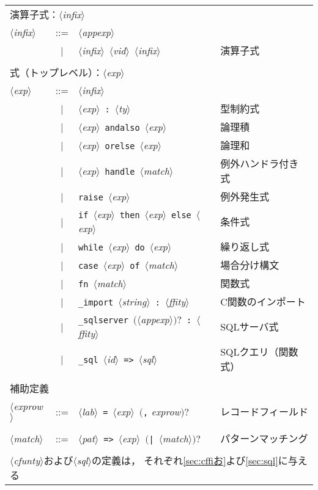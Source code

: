 \documentclass{jbook}
\newcommand{\vbar}{\mbox{\ $|$\ }}
\newcommand{\nonterm}[1]{\mbox{$\langle$}{\it #1}\mbox{$\rangle$}}
\newcommand{\term}[1]{\mbox{{\tt #1}}}
\newcommand{\optional}[1]{\mbox{$($}{\protect #1}\mbox{$)?$}}
\begin{document}
\begin{center}
\begin{tabular}{lcll}
\\
\multicolumn{3}{l}{演算子式：\nonterm{infix}}
\\
\nonterm{infix}&::=& 
       \nonterm{appexp}& \\
&\vbar&\nonterm{infix}\ \nonterm{vid}\ \nonterm{infix} & 演算子式\\
\\
\multicolumn{3}{l}{式（トップレベル）：\nonterm{exp}}
\\
\nonterm{exp} &::=& 
        \nonterm{infix} \\
&\vbar &\nonterm{exp}\ \term{:}\ \nonterm{ty} & 型制約式\\
&\vbar &\nonterm{exp}\ \term{andalso}\ \nonterm{exp} & 論理積\\
&\vbar &\nonterm{exp}\ \term{orelse}\ \nonterm{exp} & 論理和\\
&\vbar &\nonterm{exp}\ \term{handle}\ \nonterm{match} & 例外ハンドラ付き式\\
&\vbar &\term{raise}\ \nonterm{exp} & 例外発生式\\
&\vbar &\term{if}\ \nonterm{exp}\ \term{then}\ \nonterm{exp}\ \term{else}\ \nonterm{exp}& 条件式\\
&\vbar &\term{while}\ \nonterm{exp}\ \term{do}\ \nonterm{exp}& 繰り返し式\\
&\vbar &\term{case}\ \nonterm{exp}\ \term{of}\ \nonterm{match}& 場合分け構文\\
&\vbar &\term{fn}\ \nonterm{match}& 関数式\\
&\vbar &\term{\_import}\ \nonterm{string}\ \term{:}\ \nonterm{ffity} & C関数のインポート\\
&\vbar &\term{\_sqlserver}\ \optional{\nonterm{appexp}}\ \term{:}\ \nonterm{ffity} & SQLサーバ式\\
&\vbar &\term{\_sql}\ \nonterm{id}\ \term{=>}\ \nonterm{sql} & SQLクエリ（関数式）\\
\\
\multicolumn{3}{l}{補助定義}
\\
\nonterm{exprow}&::=& 
       \nonterm{lab}\ \term{=}\ \nonterm{exp}\ \optional{\term{,} {\it exprow}} & レコードフィールド\\
\\
\nonterm{match} &::=& 
       \nonterm{pat}\ \term{=>}\ \nonterm{exp}\ \optional{\term{|}\ \nonterm{match}} & パターンマッチング\\
\\
\multicolumn{4}{l}{\nonterm{cfunty}および\nonterm{sql}の定義は，
それぞれ\ref{sec:cffiお}よび\ref{sec:sql}に与える}
\end{tabular}
\end{center}
\end{document}

